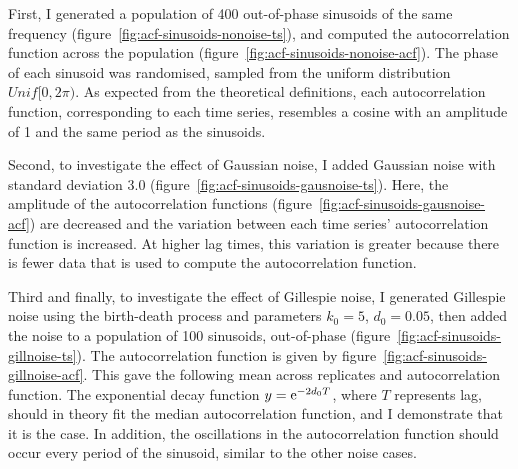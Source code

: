 First, I generated a population of 400 out-of-phase sinusoids of the same frequency (figure~\ref{fig:acf-sinusoids-nonoise-ts}), and computed the autocorrelation function across the population (figure~\ref{fig:acf-sinusoids-nonoise-acf}).
The phase of each sinusoid was randomised, sampled from the uniform distribution \(Unif[0,2\pi)\).
As expected from the theoretical definitions, each autocorrelation function, corresponding to each time series, resembles a cosine with an amplitude of 1 and the same period as the sinusoids.

Second, to investigate the effect of Gaussian noise, I added Gaussian noise with standard deviation 3.0 (figure~\ref{fig:acf-sinusoids-gausnoise-ts}).
Here, the amplitude of the autocorrelation functions (figure~\ref{fig:acf-sinusoids-gausnoise-acf}) are decreased and the variation between each time series' autocorrelation function is increased.
At higher lag times, this variation is greater because there is fewer data that is used to compute the autocorrelation function.

Third and finally, to investigate the effect of Gillespie noise, I generated Gillespie noise using the birth-death process and parameters $k_{0} = 5$, $d_{0} = 0.05$, then added the noise to a population of 100 sinusoids, out-of-phase (figure~\ref{fig:acf-sinusoids-gillnoise-ts}).
The autocorrelation function is given by figure~\ref{fig:acf-sinusoids-gillnoise-acf}.
This gave the following mean across replicates and autocorrelation function.
The exponential decay function $y = \mathrm{e}^{-2d_{0}T}$, where \(T\) represents lag, should in theory fit the median autocorrelation function, and I demonstrate that it is the case.
In addition, the oscillations in the autocorrelation function should occur every period of the sinusoid, similar to the other noise cases.


